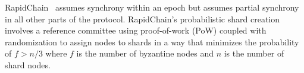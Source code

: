 \documentclass[11pt,dvipdfm]{article}
\begin{document}






RapidChain~\cite{ZMR18} assumes synchrony within an epoch but assumes partial synchrony in all other parts of the protocol. RapidChain's probabilistic shard creation involves a reference committee using proof-of-work (PoW) coupled with randomization to assign nodes to shards in a way that minimizes the probability of $f > n/3$ where $f$ is the number of byzantine nodes and $n$ is the number of shard nodes.
\end{document}
